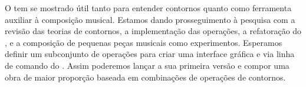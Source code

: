 O \goiaba{} tem se mostrado útil tanto para entender contornos quanto
como ferramenta auxiliar à composição musical. Estamos dando
prosseguimento à pesquisa com a revisão das teorias de contornos, a
implementação das operações, a refatoração do \goiaba{}, e a
composição de pequenas peças musicais como experimentos. Esperamos
definir um subconjunto de operações para criar uma interface gráfica e
via linha de comando do \goiaba{}. Assim poderemos lançar a sua
primeira versão e compor uma obra de maior proporção baseada em
combinações de operações de contornos.

